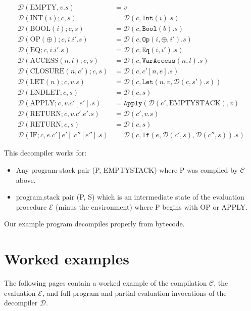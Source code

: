 \documentclass[11pt]{article}
\begin{document}
\begin{align*}
\mathcal{D}(\text{EMPTY}, v.s) &= v\\
\mathcal{D}(\text{INT}(i); c, s) &= \mathcal{D}(c, \texttt{Int}(i).s)\\
\mathcal{D}(\text{BOOL}(i); c, s) &= \mathcal{D}(c, \texttt{Bool}(b).s)\\
\mathcal{D}(\text{OP}(\oplus); c, i.i'.s) &= \mathcal{D}(c, \texttt{Op}(i, \oplus, i').s) \\
\mathcal{D}(\text{EQ}; c, i.i'.s) &= \mathcal{D}(c, \texttt{Eq}(i, i').s)\\
\mathcal{D}(\text{ACCESS}(n, l); c, s) &= \mathcal{D}(c, \texttt{VarAccess}(n, l).s)\\
\mathcal{D}(\text{CLOSURE}(n, c'); c, s) &= \mathcal{D}(c, c'[n, e].s)\\
\mathcal{D}(\text{LET}(n); c, v.s) &= \mathcal{D}(c, \texttt{Let}(n, v, \mathcal{D}(c, s').s))\\
\mathcal{D}(\text{ENDLET}; c, s) &= \mathcal{D}(c, s)\\
\mathcal{D}(\text{APPLY}; c, v.c'[e'].s) &= \texttt{Apply}(\mathcal{D}(c', \text{EMPTYSTACK}), v)\\
\mathcal{D}(\text{RETURN}; c, v.c'.e'.s) &= \mathcal{D}(c', v.s)\\
\mathcal{D}(\text{RETURN}; c, s) &= \mathcal{D}(c, s)\\
\mathcal{D}(\text{IF}; c, e.c'[e'].c''[e''].s) &= \mathcal{D}(c, \texttt{If}(e, \mathcal{D}(c', s), \mathcal{D}(c'', s)).s)
\end{align*}

\noindent This decompiler works for:

\begin{itemize}
\item Any program-stack pair (P, EMPTYSTACK) where P was compiled by $\mathcal{C}$ above.
\item program,stack pair (P, S) which is an intermediate state of the evaluation procedure $\mathcal{E}$ (minus the environment) where P begins with OP or APPLY.
\end{itemize}

\noindent Our example program decompiles properly from bytecode.

\section{Worked examples}

The following pages contain a worked example of the compilation $\mathcal{C}$, the evaluation $\mathcal{E}$, and full-program and partial-evaluation invocations of the decompiler $\mathcal{D}$.
\end{document}
